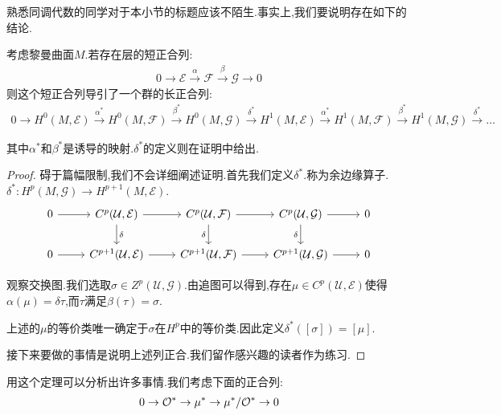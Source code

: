 熟悉同调代数的同学对于本小节的标题应该不陌生.事实上,我们要说明存在如下的结论.
\begin{theorem}
	考虑黎曼曲面$M$.若存在层的短正合列:
	\begin{align*}
		0 \to \mathcal{E} \stackrel{\alpha}{\rightarrow} \mathcal{F} \stackrel{\beta}{\rightarrow} \mathcal{G} \to 0
	\end{align*}
	则这个短正合列导引了一个群的长正合列:
	\begin{align*}
		0 \to H^0(M,\mathcal{E}) \stackrel{\alpha^*}{\rightarrow} H^0(M,\mathcal{F}) \stackrel{\beta^*}{\rightarrow} H^0(M,\mathcal{G}) \stackrel{\delta^*}{\rightarrow} H^1(M,\mathcal{E}) \stackrel{\alpha^*}{\rightarrow} H^1(M,\mathcal{F}) \stackrel{\beta^*}
{\rightarrow} H^1(M,\mathcal{G}) \stackrel{\delta^*}{\rightarrow} \dots
	\end{align*}

	其中$\alpha^*$和$\beta^*$是诱导的映射.$\delta^*$的定义则在证明中给出.
\end{theorem}
\begin{proof}
	碍于篇幅限制,我们不会详细阐述证明.首先我们定义$\delta^*$.称为余边缘算子.$\delta^*:H^p(M,\mathcal{G}) \to H^{p+1}(M,\mathcal{E})$.
    \[\begin{tikzcd}
	0 & {C^p(\mathcal{U},\mathcal{E})} & {C^p(\mathcal{U},\mathcal{F})} & {C^p(\mathcal{U},\mathcal{G})} & 0 \\
	0 & {C^{p+1}(\mathcal{U},\mathcal{E})} & {C^{p+1}(\mathcal{U},\mathcal{F})} & {C^{p+1}(\mathcal{U},\mathcal{G})} & 0
	\arrow[from=1-1, to=1-2]
	\arrow[from=1-2, to=1-3]
	\arrow["\delta", from=1-2, to=2-2]
	\arrow[from=1-3, to=1-4]
	\arrow["\delta"', from=1-3, to=2-3]
	\arrow[from=1-4, to=1-5]
	\arrow["\delta"', from=1-4, to=2-4]
	\arrow[from=2-1, to=2-2]
	\arrow[from=2-2, to=2-3]
	\arrow[from=2-3, to=2-4]
	\arrow[from=2-4, to=2-5]
\end{tikzcd}\]

   观察交换图.我们选取$\sigma \in Z^p(\mathcal{U},\mathcal{G})$.由追图可以得到,存在$\mu \in C^p(\mathcal{U},\mathcal{E})$使得$\alpha(\mu)=\delta \tau$,而$\tau$满足$\beta(\tau)=\sigma$.

   上述的$\mu$的等价类唯一确定于$\sigma$在$H^p$中的等价类.因此定义$\delta^*([\sigma])=[\mu]$.

   接下来要做的事情是说明上述列正合.我们留作感兴趣的读者作为练习.

\end{proof}

用这个定理可以分析出许多事情.我们考虑下面的正合列:
\begin{align*}
	0 \to \mathcal{O}^* \to \mu^* \to \mu^*/\mathcal{O}^* \to 0
\end{align*}

